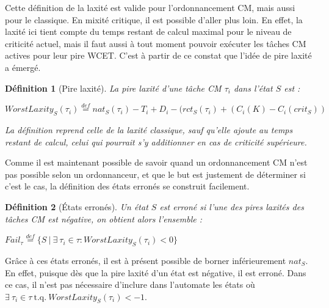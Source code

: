 \documentclass[12pt,a4paper,oneside]{book}
\theoremstyle{break}
\newtheorem{defin}{Définition}[chapter]
\theoremstyle{breakplain}
\begin{document}
Cette définition de la laxité est valide pour l'ordonnancement CM, mais aussi pour le classique. En mixité critique, il est possible d'aller plus loin. En effet, la laxité ici tient compte du temps restant de calcul maximal pour le niveau de criticité actuel, mais il faut aussi à tout moment pouvoir exécuter les tâches CM actives pour leur pire WCET. C'est à partir de ce constat que l'idée de pire laxité a émergé.\\

\begin{defin}[Pire laxité]
\label{spo:worstlaxity}
La pire laxité d'une tâche CM $\tau_i$ dans l'état $S$ est :

\begin{center}
$ WorstLaxity_S(\tau_i) \overset{def}{=} nat_S(\tau_i) -T_i + D_i - (rct_S(\tau_i) + (C_i(K)-C_i(crit_S))$\\
\end{center}

La définition reprend celle de la laxité classique, sauf qu'elle ajoute au temps restant de calcul, celui qui pourrait s'y additionner en cas de criticité supérieure.\\
\end{defin}

Comme il est maintenant possible de savoir quand un ordonnancement CM n'est pas possible selon un ordonnanceur, et que le but est justement de déterminer si c'est le cas, la définition des états erronés se construit facilement.\\

\begin{defin}[États erronés]
\label{spo:failstate}
Un état $S$ est erroné si l'une des pires laxités des tâches CM est négative, on obtient alors l'ensemble :

\begin{center}
$Fail_\tau \overset{def}{=} \{S\ |\ \exists\ \tau_i \in \tau : WorstLaxity_S(\tau_i) < 0  \}$\\
\end{center}
\end{defin}

Grâce à ces états erronés, il est à présent possible de borner inférieurement $nat_S$. En effet, puisque dès que la pire laxité d'un état est négative, il est erroné. Dans ce cas, il n'est pas nécessaire d'inclure dans l'automate les états où $\exists\ \tau_i \in \tau\ \mbox{t.q.}\ WorstLaxity_S(\tau_i) < -1$.\\
\end{document}
